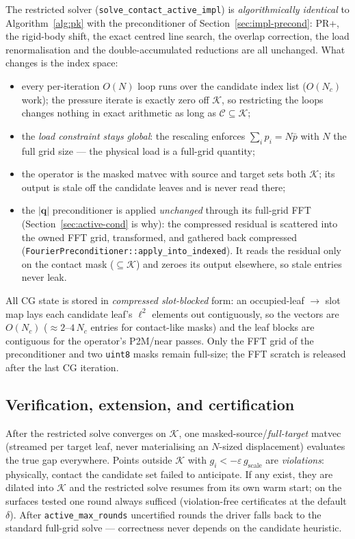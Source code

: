 \documentclass[11pt,a4paper]{article}
\newcommand{\calC}{\mathcal{C}}
\begin{document}
The restricted solver
(\texttt{solve\_contact\_active\_impl}) is \emph{algorithmically identical}
to Algorithm~\ref{alg:pk} with the preconditioner of
Section~\ref{sec:impl-precond}: PR+, the rigid-body shift, the exact centred
line search, the overlap correction, the load renormalisation and the
double-accumulated reductions are all unchanged.  What changes is the index
space:
\begin{itemize}
  \item every per-iteration $O(N)$ loop runs over the candidate index list
        ($O(N_c)$ work); the pressure iterate is exactly zero off
        $\mathcal{K}$, so restricting the loops changes nothing in exact
        arithmetic as long as $\calC \subseteq \mathcal{K}$;
  \item the \emph{load constraint stays global}: the rescaling enforces
        $\sum_i p_i = N\bar p$ with $N$ the full grid size --- the physical
        load is a full-grid quantity;
  \item the operator is the masked matvec with source and target sets both
        $\mathcal{K}$; its output is stale off the candidate leaves and is
        never read there;
  \item the $|\mathbf q|$ preconditioner is applied \emph{unchanged} through
        its full-grid FFT (Section~\ref{sec:active-cond} is why): the
        compressed residual is scattered into the owned FFT grid, transformed,
        and gathered back compressed
        (\texttt{FourierPreconditioner::apply\_into\_indexed}).  It reads the
        residual only on the contact mask ($\subseteq \mathcal{K}$) and zeroes
        its output elsewhere, so stale entries never leak.
\end{itemize}
All CG state is stored in \emph{compressed slot-blocked} form: an
occupied-leaf $\to$ slot map lays each candidate leaf's $\ell^2$ elements out
contiguously, so the vectors are $O(N_c)$ ($\approx 2$--$4\,N_c$ entries for
contact-like masks) and the leaf blocks are contiguous for the operator's
P2M/near passes.  Only the FFT grid of the preconditioner and two
\texttt{uint8} masks remain full-size; the FFT scratch is released after the
last CG iteration.

\subsection{Verification, extension, and certification}
\label{sec:active-verify}

After the restricted solve converges on $\mathcal{K}$, one
masked-source/\emph{full-target} matvec (streamed per target leaf, never
materialising an $N$-sized displacement) evaluates the true gap everywhere.
Points outside $\mathcal{K}$ with $g_i < -\varepsilon\,g_{\mathrm{scale}}$
are \emph{violations}: physically, contact the candidate set failed to
anticipate.  If any exist, they are dilated into $\mathcal{K}$ and the
restricted solve resumes from its own warm start; on the surfaces tested one
round always sufficed (violation-free certificates at the default
$\delta$).  After \texttt{active\_max\_rounds} uncertified rounds the driver
falls back to the standard full-grid solve --- correctness never depends on
the candidate heuristic.
\end{document}

